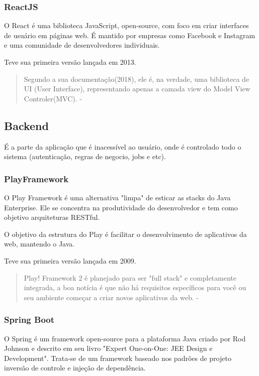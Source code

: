 \subsubsection{ReactJS}

O React é uma biblioteca JavaScript, open-source, com foco em criar interfaces de usuário em páginas web. É mantido por empresas como Facebook e Instagram e uma comunidade de desenvolvedores individuais. 

Teve sua primeira versão lançada em 2013.

\begin{quote}
  Segundo a sua documentação(2018), ele é, na  verdade,  uma  biblioteca  de  UI  (User  Interface),  representando  apenas  a  camada view do Model  View  Controler(MVC).  - \cite{ferreira2018analise}
\end{quote}

\subsection{Backend}

É a parte da aplicação que é inacessível ao usuário, onde é controlado todo o sistema (autenticação, regras de negocio, jobs e etc).

\subsubsection{PlayFramework}

O Play Framework é uma alternativa "limpa" de esticar as stacks do Java Enterprise. Ele se concentra na produtividade do desenvolvedor e tem como objetivo arquiteturas RESTful. 

O objetivo da estrutura do Play é facilitar o desenvolvimento de aplicativos da web, mantendo o Java.

Teve sua primeira versão lançada em 2009.

\begin{quote}
Play! Framework 2 é planejado para ser "full stack" e completamente integrada, a boa notícia é que não há requisitos específicos para você ou seu ambiente começar a criar novos aplicativos da web. - \cite{petrella2013learning}
\end{quote}

\subsubsection{Spring Boot}

O Spring é um framework open-source para a plataforma Java criado por Rod Johnson e descrito em seu livro "Expert One-on-One: JEE Design e Development".
Trata-se de um framework baseado nos padrões de projeto inversão de controle e injeção de dependência.

